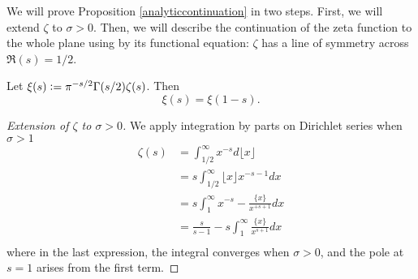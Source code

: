 We will prove Proposition \ref{analyticcontinuation} in two steps. First, we will extend $\zeta$ to $\sigma>0$. Then, we will describe the continuation of the zeta function to the whole plane using by its functional equation: $\zeta$ has a line of symmetry across $\Re (s)=1/2$.
\begin{proposition}\label{extension}
	Let $\xi(s)\mathrel{\mathop:}= \pi^{-s/2}\Gamma(s/2)\zeta(s)$. Then \begin{equation}\label{symmetryeq}
		\xi(s) = \xi(1-s).
	\end{equation}
\end{proposition}
\begin{proof}[Extension of $\zeta$ to $\sigma>0$]
	We apply integration by parts on Dirichlet series when $\sigma>1$ \begin{align*}
		\zeta(s)&=\int_{1/2}^{\infty} x^{-s} d \lfloor x \rfloor \\
				&= s \int_{1/2}^{\infty} \lfloor x \rfloor x^{-s-1} d x\\
				&=  s \int_{1}^{\infty}  x^{-s} - \frac{\{x\}}{x^{+s+1}} d x\\
				&= \frac{s}{s-1} - s \int_{1}^{\infty} \frac{\{x\}}{x^{s+1}} dx\\
	\end{align*}
	where in the last expression, the integral converges when $\sigma>0$, and the pole at $s=1$ arises from the first term.
\end{proof}


